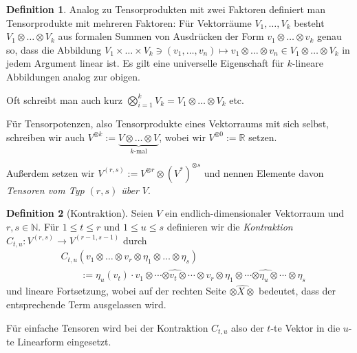 \documentclass[a4paper]{scrbook}
\numberwithin{equation}{chapter}
\theoremstyle{definition}
\newtheorem{defn}{Definition}[section]
\begin{document}
\begin{defn}
	Analog zu Tensorprodukten mit zwei Faktoren definiert man Tensorprodukte mit mehreren Faktoren: Für Vektorräume $V_1, \dots, V_k$ besteht $V_1 \otimes \dots \otimes V_k$ aus formalen Summen von Ausdrücken der Form $v_1 \otimes \dots \otimes v_k$ genau so, dass die Abbildung $V_1 \times \dots \times V_k \ni (v_1,\dots,v_n) \mapsto v_1 \otimes \dots \otimes v_n \in V_1 \otimes \dots \otimes V_k$ in jedem Argument linear ist. Es gilt eine universelle Eigenschaft für $k$-lineare Abbildungen analog zur obigen.

	Oft schreibt man auch kurz $\bigotimes_{i=1}^k V_k = V_1 \otimes \dots \otimes V_k$ etc.

	Für \glqq Tensorpotenzen\grqq, also Tensorprodukte eines Vektorraums mit sich selbst, schreiben wir auch $V^{\otimes k} := \underbrace{V \otimes \dots \otimes V}_\text{$k$-mal}$, wobei wir $V^{\otimes 0} := \mathbb R$ setzen.

	Außerdem setzen wir $V^{(r,s)} := V^{\otimes r} \otimes (V^*)^{\otimes s}$ und nennen Elemente davon \emph{Tensoren vom Typ $(r,s)$ über $V$}.
\end{defn}
\begin{defn}[Kontraktion]
	Seien $V$ ein endlich-dimensionaler Vektorraum und $r,s \in \mathbb N$. Für $1 \le t \le r$ und $1 \le u \le s$ definieren wir die \emph{Kontraktion} $C_{t,u} \colon V^{(r,s)} \to V^{(r-1,s-1)}$ durch
	\begin{align*}
	&C_{t,u}(v_1 \otimes \dots \otimes v_r \otimes \eta_1 \otimes \dots \otimes \eta_s) \\& \qquad := \eta_u(v_t) \cdot v_1 \otimes \cdots \widehat{\otimes v_t \otimes} \cdots \otimes v_r \otimes \eta_1 \otimes \cdots \widehat{\otimes \eta_u \otimes} \cdots \otimes \eta_s
	\end{align*}
	und lineare Fortsetzung, wobei auf der rechten Seite $\widehat{\otimes X \otimes}$ bedeutet, dass der entsprechende Term ausgelassen wird.
	
	Für einfache Tensoren wird bei der Kontraktion $C_{t,u}$ also der $t$-te Vektor in die $u$-te Linearform eingesetzt.
\end{defn}
\end{document}
